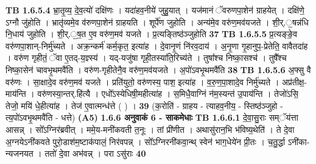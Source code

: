 \documentclass[17pt]{extarticle}
\begin{document}
                  \newline
                                \textbf{ TB 1.6.5.4} \newline
                  भ्रा॒तृ॒व्य॒ दे॒व॒त्यो॑ दक्षि॑णः । यदा॑हव॒नीये॑ जुहु॒यात् । यज॑मानं ॅवरुणपा॒शेन॑ ग्राहयेत् । दक्षि॑णे॒ ऽग्नौ जु॑होति । भ्रातृ॑व्यमे॒व व॑रुणपा॒शेन॑ ग्राहयति । शूर्पे॑ण जुहोति । अन्य॑मे॒व वरु॑ण॒मव॑यजते । शी॒र्.॒षन्न॑धि नि॒धाय॑ जुहोति । शी॒र्.॒ष॒त ए॒व वरु॑ण॒मव॑ यजते । प्र॒त्यङ्तिष्ठ॑ञ्जुहोति \textbf{ 37} \newline
                  \newline
                                \textbf{ TB 1.6.5.5} \newline
                  प्र॒त्यङ्ङे॒व वरु॑णपा॒शान्-निर्मु॑च्यते । अक्र॒न्कर्म॑ कर्म॒कृत॒ इत्या॑ह । दे॒वानृ॒णं नि॑रव॒दाय॑ । अ॒नृ॒णा गृ॒हानुप॒-प्रेतेति॒ वावैतदा॑ह । वरु॑ण गृहीतं॒ ॅवा ए॒तद्-य॒ज्ञ्स्य॑ । यद्-यजु॑षा गृही॒तस्या॑ति॒रिच्य॑ते । तुषा᳚श्च निष्का॒सश्च॑ । तुषै᳚श्च निष्का॒सेन॑ चावभृ॒थमवै॑ति । वरु॑ण-गृहीतेनै॒व वरु॑ण॒मव॑यजते । अ॒पो॑ऽवभृ॒थमवै॑ति \textbf{ 38} \newline
                  \newline
                                \textbf{ TB 1.6.5.6} \newline
                  अ॒फ्सु वै वरु॑णः । सा॒क्षादे॒व वरु॑ण॒मव॑ यजते । प्रति॑युतो॒ वरु॑णस्य॒ पाश॒ इत्या॑ह । व॒रु॒ण॒पा॒शादे॒व निर्मु॑च्यते । अप्र॑तीक्ष॒-माय॑न्ति । वरु॑णस्या॒न्तर्.हि॑त्यै । एधो᳚ऽस्येधिषी॒महीत्या॑ह । स॒मिधै॒वाग्निं न॑म॒स्यन्त॑ उ॒पाय॑न्ति । तेजो॑ऽसि॒ तेजो॒ मयि॑ धे॒हीत्या॑ह । तेज॑ ए॒वात्मन्ध॑त्ते ( ) । \textbf{ 39} \newline
                  \newline
                                    (क॒रोति॑ - ग्राहय - त्याहव॒नीय॒ - स्तिष्ठ॑ञ्जुहो - त्य॒पो॑ऽवभृ॒थमवै॑ति - धत्ते) \textbf{(A5)} \newline \newline
                \textbf{ 1.6.6     अनुवाकं   6 - साकमेधाः} \newline
                                \textbf{ TB 1.6.6.1} \newline
                  दे॒वा॒सु॒राः सम्ॅय॑त्ता आसन्न् । सो᳚ऽग्निर॑ब्रवीत् । ममे॒य-मनी॑कवती त॒नूः । तां प्री॑णीत । अथासु॑रान॒भि भ॑विष्य॒थेति॑ । ते दे॒वा अ॒ग्नयेऽनी॑कवते पुरो॒डाश॑म॒ष्टाक॑पालं॒ निर॑वपन्न् । सो᳚ऽग्निरनी॑कवा॒न्थ् स्वेन॑ भाग॒धेये॑न प्री॒तः । च॒तु॒र्द्धा ऽनी॑का-न्यजनयत । ततो॑ दे॒वा अभ॑वन्न् । परा ऽसु॑राः \textbf{ 40} \newline
                  \newline
\end{document}
